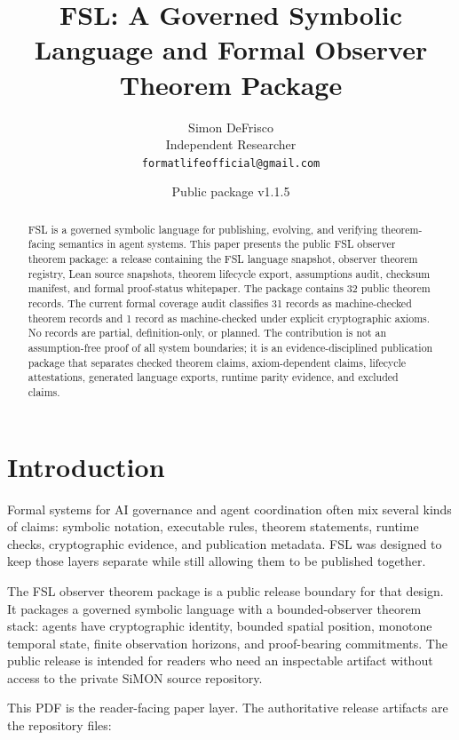 \documentclass[11pt]{article}
\title{FSL: A Governed Symbolic Language and Formal Observer Theorem Package}
\author{Simon DeFrisco\\Independent Researcher\\\texttt{formatlifeofficial@gmail.com}}
\date{Public package v1.1.5}
\begin{document}
\maketitle

\begin{abstract}
FSL is a governed symbolic language for publishing, evolving, and verifying theorem-facing semantics in agent systems. This paper presents the public FSL observer theorem package: a release containing the FSL language snapshot, observer theorem registry, Lean source snapshots, theorem lifecycle export, assumptions audit, checksum manifest, and formal proof-status whitepaper. The package contains 32 public theorem records. The current formal coverage audit classifies 31 records as machine-checked theorem records and 1 record as machine-checked under explicit cryptographic axioms. No records are partial, definition-only, or planned. The contribution is not an assumption-free proof of all system boundaries; it is an evidence-disciplined publication package that separates checked theorem claims, axiom-dependent claims, lifecycle attestations, generated language exports, runtime parity evidence, and excluded claims.
\end{abstract}

\section{Introduction}

Formal systems for AI governance and agent coordination often mix several kinds of claims: symbolic notation, executable rules, theorem statements, runtime checks, cryptographic evidence, and publication metadata. FSL was designed to keep those layers separate while still allowing them to be published together.

The FSL observer theorem package is a public release boundary for that design. It packages a governed symbolic language with a bounded-observer theorem stack: agents have cryptographic identity, bounded spatial position, monotone temporal state, finite observation horizons, and proof-bearing commitments. The public release is intended for readers who need an inspectable artifact without access to the private SiMON source repository.

This PDF is the reader-facing paper layer. The authoritative release artifacts are the repository files:
\end{document}
